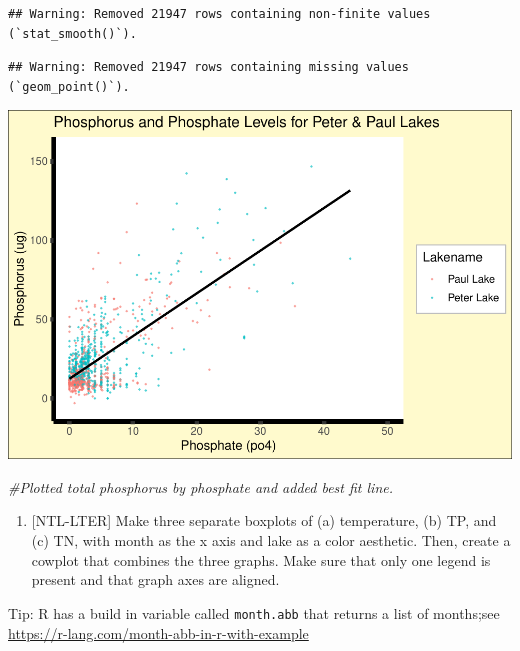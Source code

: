 \documentclass[
]{article}
\newenvironment{Shaded}{\begin{snugshade}}{\end{snugshade}}
\newcommand{\CommentTok}[1]{\textcolor[rgb]{0.56,0.35,0.01}{\textit{#1}}}
\providecommand{\tightlist}{%
  \setlength{\itemsep}{0pt}\setlength{\parskip}{0pt}}
\begin{document}
\begin{verbatim}
## Warning: Removed 21947 rows containing non-finite values (`stat_smooth()`).
\end{verbatim}

\begin{verbatim}
## Warning: Removed 21947 rows containing missing values (`geom_point()`).
\end{verbatim}

\includegraphics{EmmaChilds_A05_DataVisualization_files/figure-latex/plot total P vs PO4-1.pdf}

\begin{Shaded}
\begin{Highlighting}[]
\CommentTok{\#Plotted total phosphorus by phosphate and added best fit line. }
\end{Highlighting}
\end{Shaded}

\begin{enumerate}
\def\labelenumi{\arabic{enumi}.}
\setcounter{enumi}{4}
\tightlist
\item
  {[}NTL-LTER{]} Make three separate boxplots of (a) temperature, (b)
  TP, and (c) TN, with month as the x axis and lake as a color
  aesthetic. Then, create a cowplot that combines the three graphs. Make
  sure that only one legend is present and that graph axes are aligned.
\end{enumerate}

Tip: R has a build in variable called \texttt{month.abb} that returns a
list of months;see \url{https://r-lang.com/month-abb-in-r-with-example}
\end{document}
